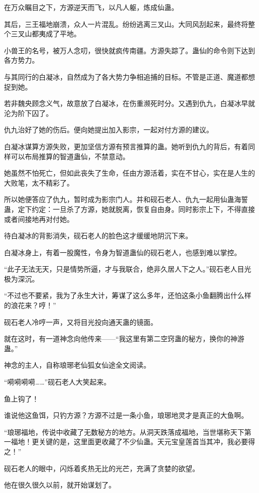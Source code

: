 \begin{this_body}
在万众瞩目之下，方源逆天而飞，以凡人躯，炼成仙蛊。

其后，三王福地崩溃，众人一片混乱。纷纷逃离三叉山。大同风刮起来，最终将整个三叉山都夷成了平地。

小兽王的名号，被万人念叨，很快就疯传南疆。方源失踪了。蛊仙的命令则下达到各方势力。

与其同行的白凝冰，自然成为了各大势力争相追捕的目标。不管是正道、魔道都想捉到她。

若非魏央顾念义气，故意放了白凝冰，在伤重濒死时分。又遇到仇九，白凝冰早就沦为阶下囚了。

仇九治好了她的伤后。便向她提出加入影宗，一起对付方源的建议。

白凝冰谋算方源失败，更加坚信方源有预言推算的蛊。她听到仇九的背后，有着同样可以布局推算的智道蛊仙，不禁意动。

她虽然不怕死亡，但如此丧失了生命，任由方源活着，实在不甘心，实在是人生的大败笔，太不精彩了。

所以她便答应了仇九，暂时成为影宗门人。并和砚石老人、仇九一起用仙蛊海誓蛊，定下约定：一旦杀了方源，她就脱离，恢复自由身。同时影宗上下，不得直接或者间接地再对付她。

待白凝冰的背影消失，砚石老人的脸色这才缓缓地阴沉下来。

白凝冰身上，有着一股魔性，令身为智道蛊仙的砚石老人，也感到难以掌控。

“此子无法无天，只是情势所逼，才与我联合，绝非久居人下之人。”砚石老人目光极为深沉。

“不过也不要紧，我为了永生大计，筹谋了这么多年，还怕这条小鱼翻腾出什么样的浪花来？哼！”

砚石老人冷哼一声，又将目光投向通天蛊的镜面。

就在这时，有一道神念向他传来——“我这里有第二空窍蛊的秘方，换你的神游蛊。”

神念的主人，自称琅琊老仙狐女仙途全文阅读。

“嗬嗬嗬嗬……”砚石老人大笑起来。

鱼上钩了！

谁说他这鱼饵，只钓方源？方源不过是一条小鱼，琅琊地灵才是真正的大鱼啊。

“琅琊福地，传说中收藏了无数秘方的地方。从洞天跌落成福地，当世堪称天下第一福地！更关键的是，这里面更收藏了不少仙蛊。天元宝皇莲首当其冲，我必要得之！”

砚石老人的眼中，闪烁着炙热无比的光芒，充满了贪婪的欲望。

他在很久很久以前，就开始谋划了。


\end{this_body}
